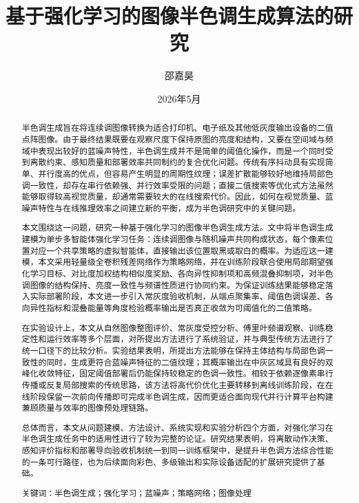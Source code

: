 \documentclass[thesis]{../zstucs-graduation-project}
\title{基于强化学习的图像半色调生成算法的研究}
\author{邵嘉昊}
\date{2026年5月}
\begin{document}
\begingroup
\hypersetup{pageanchor=false}
\hfuzz=10pt
\maketitle
\endgroup
\hypersetup{pageanchor=true}

\begin{abstract}
半色调生成旨在将连续调图像转换为适合打印机、电子纸及其他低灰度输出设备的二值点阵图像。由于最终结果既要在观察尺度下保持原图的亮度和结构，又要在空间域与频域中表现出较好的蓝噪声特性，半色调生成并不是简单的阈值化操作，而是一个同时受到离散约束、感知质量和部署效率共同制约的复合优化问题。传统有序抖动具有实现简单、并行度高的优点，但容易产生明显的周期性纹理；误差扩散能够较好地维持局部色调一致性，却存在串行依赖强、并行效率受限的问题；直接二值搜索等优化式方法虽然能够取得较高视觉质量，却通常需要较大的在线搜索代价。因此，如何在视觉质量、蓝噪声特性与在线推理效率之间建立新的平衡，成为半色调研究中的关键问题。

本文围绕这一问题，研究一种基于强化学习的图像半色调生成方法。文中将半色调生成建模为单步多智能体强化学习任务：连续调图像与随机噪声共同构成状态，每个像素位置对应一个共享策略的虚拟智能体，直接输出该位置取黑或取白的概率。为适应这一建模，本文采用轻量级全卷积残差网络作为策略网络，并在训练阶段联合使用局部期望强化学习目标、对比度加权结构相似度奖励、各向异性抑制项和高频混叠抑制项，对半色调图像的结构保持、亮度一致性与频谱性质进行协同约束。为保证训练结果能够稳定落入实际部署阶段，本文进一步引入常灰度验收机制，从端点聚集率、阈值色调误差、各向异性指标和混叠能量等角度检验概率输出是否真正收敛为可阈值化的二值策略。

在实验设计上，本文从自然图像整图评价、常灰度受控分析、傅里叶频谱观察、训练稳定性和运行效率等多个层面，对所提出方法进行了系统验证，并与典型传统方法进行了统一口径下的比较分析。实验结果表明，所提出方法能够在保持主体结构与局部色调一致性的同时，生成更符合蓝噪声特征的二值纹理；其概率输出在中灰区域具有良好的双峰化收敛特征，固定阈值部署后仍能保持较稳定的色调一致性。相较于依赖逐像素串行传播或反复局部搜索的传统思路，该方法将高代价优化主要转移到离线训练阶段，在在线阶段保留一次前向传播即可完成半色调生成，因而更适合面向现代并行计算平台构建兼顾质量与效率的图像预处理链路。

总体而言，本文从问题建模、方法设计、系统实现和实验分析四个方面，对强化学习在半色调生成任务中的适用性进行了较为完整的论证。研究结果表明，将离散动作决策、感知评价指标和部署导向验收机制统一到同一训练框架中，是提升半色调方法综合性能的一条可行路径，也为后续面向彩色、多级输出和实际设备适配的扩展研究提供了基础。

\par\noindent\heiti 关键词：半色调生成；强化学习；蓝噪声；策略网络；图像处理
\end{abstract}
\end{document}
